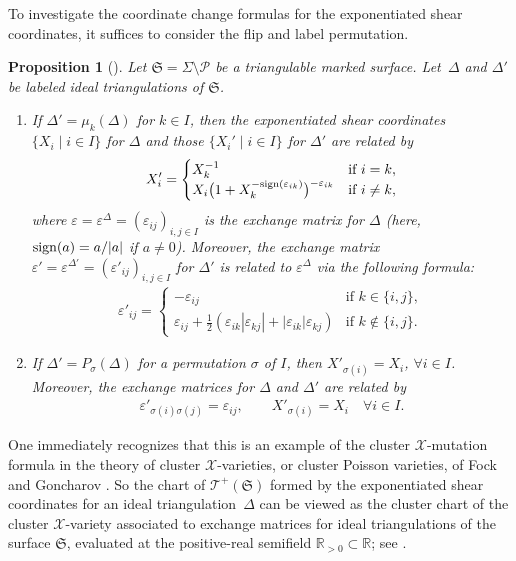 \documentclass[10pt,a4paper]{amsart}
\numberwithin{equation}{section}
\newtheorem{Proposition}[Theorem]{Proposition}
\theoremstyle{definition}
\begin{document}
To investigate the coordinate change formulas for the exponentiated shear coordinates, it suffices to consider the flip and label permutation.
\begin{Proposition}[\cite{AB, BL07, F97, FST, Liu}]
\label{prop:shear_coordinate_change}
Let $\mathfrak{S} = \Sigma\setminus \mathcal{P}$ be a triangulable marked surface. Let~$\Delta$ and $\Delta'$ be labeled ideal triangulations of $\mathfrak{S}$.
\begin{enumerate}[label={\rm (\arabic*)}]\itemsep=0pt
\item If $\Delta' = \mu_k(\Delta)$ for $k\in I$, then the exponentiated shear coordinates $\{X_i \mid i \in I\}$ for $\Delta$ and those $\{X_i'\mid i \in I\}$ for $\Delta'$ are related by
\[
X'_i =\begin{cases}
 X_k^{-1} & \mbox{if } i=k, \\
 X_i \bigl(1+X_k^{-{\rm sign}(\varepsilon_{ik})}\bigr)^{-\varepsilon_{ik}} & \mbox{if } i\neq k,
 \end{cases}
\]
where $\varepsilon = \varepsilon^\Delta=(\varepsilon_{ij})_{i,j\in I}$ is the exchange matrix for $\Delta$ (here, ${\rm sign}(a)=a/|a|$ if $a\neq 0$). Moreover, the exchange matrix $\varepsilon' = \varepsilon^{\Delta'}=(\varepsilon'_{ij})_{i,j\in I}$ for $\Delta'$ is related to $\varepsilon^\Delta$ via the following formula:
\begin{align*}
\varepsilon'_{ij}
= \begin{cases}
 -\varepsilon_{ij} & \mbox{if } k\in \{i,j\}, \\
 \varepsilon_{ij} + \frac{1}{2}(\varepsilon_{ik}|\varepsilon_{kj}| + |\varepsilon_{ik}|\varepsilon_{kj}) & \mbox{if } k\notin \{i,j\}.
 \end{cases}
\end{align*}
\item If $\Delta' = P_\sigma(\Delta)$ for a permutation $\sigma$ of $I$, then $X'_{\sigma(i)} = X_i$, $\forall i\in I$. Moreover, the exchange matrices for $\Delta$ and $\Delta'$ are related by
\begin{align*}
\varepsilon'_{\sigma(i) \sigma(j)} = \varepsilon_{ij}, \qquad
X'_{\sigma(i)} = X_i \quad \forall i \in I.
\end{align*}
\end{enumerate}
\end{Proposition}
One immediately recognizes that this is an example of the cluster $\mathscr{X}$-mutation formula in the theory of cluster $\mathscr{X}$-varieties, or cluster Poisson varieties, of Fock and Goncharov \cite{FG06, FG06b, FG09}. So the chart of $\mathscr{T}^+(\mathfrak{S})$ formed by the exponentiated shear coordinates for an ideal triangulation~$\Delta$ can be viewed as the cluster chart of the cluster $\mathscr{X}$-variety associated to exchange matrices for ideal triangulations of the surface $\mathfrak{S}$, evaluated at the positive-real semifield $\mathbb{R}_{>0} \subset \mathbb{R}$; see \cite{FG06}.
\end{document}
